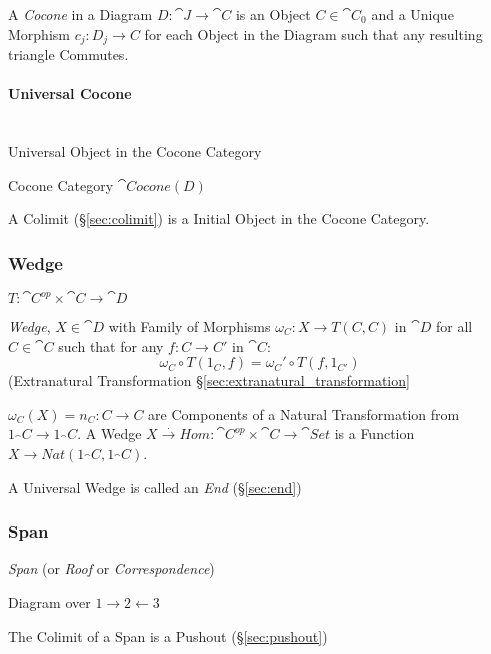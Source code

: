 A \emph{Cocone} in a Diagram $D : \cat{J} \rightarrow \cat{C}$
is an Object $C \in \cat{C}_0$ and a Unique Morphism $c_j : D_j
\rightarrow C$ for each Object in the Diagram such that any resulting
triangle Commutes.




\paragraph{Universal Cocone}\label{sec:universal_cocone}
\hfill \\

Universal Object in the Cocone Category

Cocone Category $\cat{Cocone}(D)$

A Colimit (\S\ref{sec:colimit}) is a Initial Object in the Cocone
Category.



\subsubsection{Wedge}\label{sec:wedge}

$T : \cat{C}^{op} \times \cat{C} \rightarrow \cat{D}$

\emph{Wedge}, $X \in \cat{D}$ with Family of Morphisms $\omega_C :
X \rightarrow T(C,C)$ in $\cat{D}$ for all $C \in \cat{C}$ such
that for any $f : C \rightarrow C'$ in $\cat{C}$:
\[
  \omega_C \circ T(1_C,f) = \omega_C' \circ T(f,1_{C'})
\]
(Extranatural Transformation \S\ref{sec:extranatural_transformation}

$\omega_C(X) = n_C : C \rightarrow C$ are Components of a Natural
Transformation from $1_\cat{C} \rightarrow 1_\cat{C}$. A Wedge
$X \xrightarrow{.} Hom : \cat{C}^{op} \times \cat{C} \rightarrow
\cat{Set}$ is a Function $X \rightarrow Nat
(1_\cat{C},1_\cat{C})$.

A Universal Wedge is called an \emph{End} (\S\ref{sec:end})



\subsubsection{Span}\label{sec:span}

\emph{Span} (or \emph{Roof} or \emph{Correspondence})

Diagram over $1 \rightarrow 2 \leftarrow 3$

The Colimit of a Span is a Pushout (\S\ref{sec:pushout})




